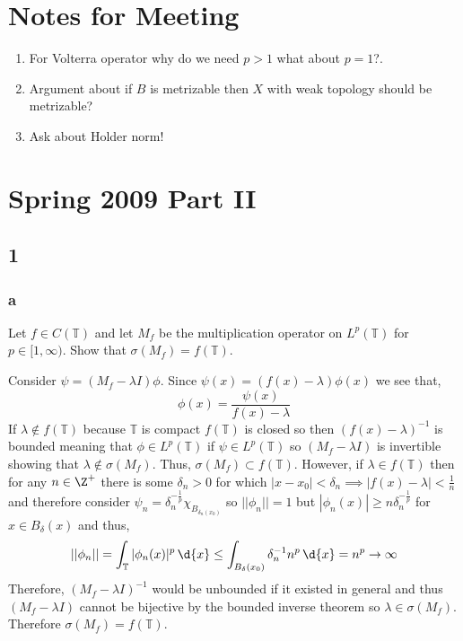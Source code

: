 \documentclass[12pt]{article}
\renewcommand{\T}{\mathbb{T}}
\begin{document}
\tableofcontents

\section{Notes for Meeting}

\begin{enumerate}
\item For Volterra operator why do we need $p > 1$ what about $p = 1$?.
\item Argument about if $B$ is metrizable then $X$ with weak topology should be metrizable?
\item Ask about Holder norm!
\end{enumerate}


\section{Spring 2009 Part II}

\subsection{1}

\subsubsection{a}

\begin{exercise}
Let $f \in C(\T)$ and let $M_f$ be the multiplication operator on $L^p(\T)$ for $p \in [1, \infty)$. Show that $\sigma(M_f) = f(\T)$.
\end{exercise}

Consider $\psi = (M_f - \lambda I) \phi$. Since $\psi(x) = (f(x) - \lambda) \phi(x)$ we see that,
\[ \phi(x) = \frac{\psi(x)}{f(x) - \lambda} \]
If $\lambda \notin f(\T)$ because $\T$ is compact $f(\T)$ is closed so then $(f(x) - \lambda)^{-1}$ is bounded meaning that $\phi \in L^p(\T)$ if $\psi \in L^p(\T)$ so $(M_f - \lambda I)$ is invertible showing that $\lambda \notin \sigma(M_f)$. Thus, $\sigma(M_f) \subset f(\T)$. However, if $\lambda \in f(\T)$ then for any $n \in \Z^{+}$ there is some $\delta_n > 0$ for which $|x - x_0| < \delta_n \implies |f(x) - \lambda| < \frac{1}{n}$ and therefore consider $\psi_n = \delta_n^{-\frac{1}{p}} \chi_{B_{\delta_n(x_0)}}$ so $|| \phi_n || = 1$ but $|\phi_n(x)| \ge n \delta_n^{- \frac{1}{p}}$ for $x \in B_\delta(x)$ and thus,
\[ ||\phi_n || =  \int_\T | \phi_n(x) |^p \, \d{x} \le \int_{B_\delta(x_0)} \delta_n^{-1} n^{p} \, \d{x} = n^p \to \infty \]
Therefore, $(M_f - \lambda I)^{-1}$ would be unbounded if it existed in general and thus $(M_f - \lambda I)$ cannot be bijective by the bounded inverse theorem so $\lambda \in \sigma(M_f)$. Therefore $\sigma(M_f) = f(\T)$.
\end{document}
